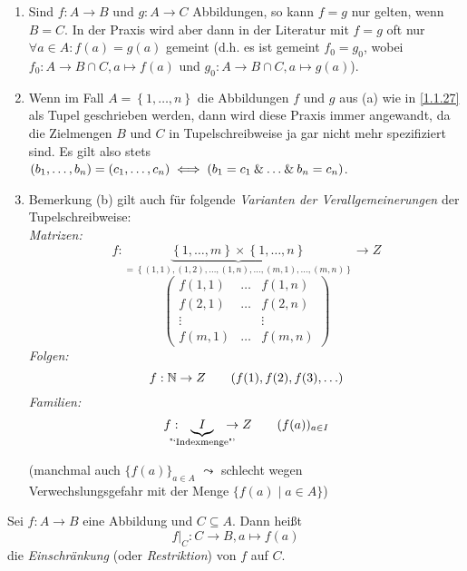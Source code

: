 \documentclass[../../main.tex]{subfiles}
\begin{document}
\begin{bem}\label{1.1.30}
\begin{enumerate}[\normalfont(a)]
\item Sind $f:A\rightarrow B$ und $g:A\rightarrow C$ Abbildungen, so kann $f=g$ nur gelten, wenn $B=C$. In der Praxis wird aber dann in der Literatur mit $f=g$ oft nur $\forall a\in A:f(a)=g(a)$ gemeint (d.h. es ist gemeint $f_0 = g_0$, wobei $f_0 : A\rightarrow B\cap C, a\mapsto f(a)$ und $g_0:A\rightarrow B\cap C,a\mapsto g(a)$).
\item Wenn im Fall $A=\left\{1,\ldots,n\right\}$ die Abbildungen $f$ und $g$ aus (a) wie in \ref{1.1.27} als Tupel geschrieben werden, dann wird diese Praxis immer angewandt, da die Zielmengen $B$ und $C$ in Tupelschreibweise ja gar nicht mehr spezifiziert sind. Es gilt also stets $(b_1,\ldots,b_n)=(c_1,\ldots,c_n)\iff (b_1=c_1\mathbin{\&}\ldots\mathbin{\&} b_n=c_n)$.
\item Bemerkung (b) gilt auch für folgende \emph{Varianten der Verallgemeinerungen} der Tupelschreibweise:\\
\emph{Matrizen:}
$$f:\underbrace{\left\{1,\ldots,m\right\}\times\left\{1,\ldots,n\right\}}_{=\left\{(1,1),(1,2),\ldots,(1,n),\ldots,(m,1),\ldots,(m,n)\right\}}\rightarrow Z$$
$$\begin{pmatrix}
f(1,1) & \ldots & f(1,n)\\
f(2,1) & \ldots & f(2,n)\\
\vdots & & \vdots\\
f(m,1) & \ldots & f(m,n)
\end{pmatrix}$$
\emph{Folgen:}
$$f:\mathbb N\rightarrow Z\qquad (f(1),f(2),f(3),\ldots)$$
\emph{Familien:}
$$f:\hspace{-1em}\underbrace{I}_\text{"`Indexmenge"'}\hspace{-1em}\rightarrow Z \qquad (f(a))_{a\in I}$$
\begin{flushright}
\footnotesize
(manchmal auch $\{f(a)\}_{a\in A}$
$\leadsto$ schlecht wegen\\Verwechslungsgefahr
mit der Menge $\{f(a)\mid a\in A\}$)
\end{flushright}
\end{enumerate}
\end{bem}

\begin{df}\label{1.1.31}
Sei $f:A\rightarrow B$ eine Abbildung und $C\subseteq A$. Dann heißt \[f|_C:C\rightarrow B, a\mapsto f(a)\] die \emph{Einschränkung} (oder \emph{Restriktion}) von $f$ auf $C$.
\end{df}
\end{document}

